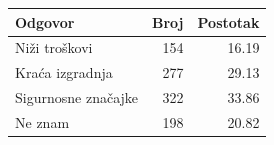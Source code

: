 \begin{tabular}{lrr}
\toprule
Odgovor & Broj & Postotak \\
\midrule
Niži troškovi & 154 & 16.19 \\
Kraća izgradnja & 277 & 29.13 \\
Sigurnosne značajke & 322 & 33.86 \\
Ne znam & 198 & 20.82 \\
\bottomrule
\end{tabular}
